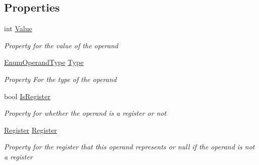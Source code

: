 \subsection*{Properties}
\begin{DoxyCompactItemize}
\item 
int \hyperlink{class_c_p_u___o_s___simulator_1_1_c_p_u_1_1_operand_ab109292eba2094db4d7f21cbdbd5bc9e}{Value}
\begin{DoxyCompactList}\small\item\em Property for the value of the operand \end{DoxyCompactList}\item 
\hyperlink{namespace_c_p_u___o_s___simulator_1_1_c_p_u_ad49cfe442b74115a326c03b7ae848f76}{Enum\+Operand\+Type} \hyperlink{class_c_p_u___o_s___simulator_1_1_c_p_u_1_1_operand_a0b0deae57b760df3a083dc54535b0891}{Type}
\begin{DoxyCompactList}\small\item\em Property For the type of the operand \end{DoxyCompactList}\item 
bool \hyperlink{class_c_p_u___o_s___simulator_1_1_c_p_u_1_1_operand_a662aacb6eb1aa9cf818181aea695e0c9}{Is\+Register}
\begin{DoxyCompactList}\small\item\em Property for whether the operand is a register or not \end{DoxyCompactList}\item 
\hyperlink{class_c_p_u___o_s___simulator_1_1_c_p_u_1_1_register}{Register} \hyperlink{class_c_p_u___o_s___simulator_1_1_c_p_u_1_1_operand_a8f08360f0e27922fc0377f5d58a9e67f}{Register}
\begin{DoxyCompactList}\small\item\em Property for the register that this operand represents or null if the operand is not a register \end{DoxyCompactList}\end{DoxyCompactItemize}
